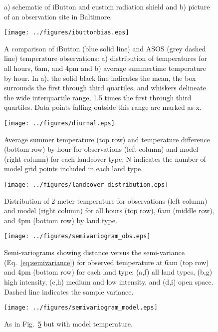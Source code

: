 \documentclass[draft,linenumbers]{agujournal}
\begin{document}
 \begin{figure}[h]
\centering
\caption{a) schematic of iButton and custom radiation shield and b) picture of an observation site in Baltimore.}
\label{fig:ibutton}
 \end{figure}
 
\begin{figure}[h]
\centering
\texttt{[image: ../figures/ibuttonbias.eps]}
\caption{A comparison of iButton (blue solid line) and ASOS (grey dashed line) temperature observations: a) distribution of temperatures for all hours,  6am, and 4pm and b) average summertime temperature by hour. In a), the solid black line indicates the mean, the box surrounds the first through third quartiles, and whiskers delineate the wide interquartile range, 1.5 times the first through third quartiles. Data points falling outside this range are marked as x. }
\label{fig:bias}
\end{figure}

\begin{figure}[h]
\centering
\texttt{[image: ../figures/diurnal.eps]}
\caption{Average summer temperature (top row) and temperature difference (bottom row) by hour for observations (left column) and model (right column) for each landcover type. N indicates the number of model grid points included in each land type. }
\label{fig:diurnal}
\end{figure}

\begin{figure}[h]
\centering
\texttt{[image: ../figures/landcover\_distribution.eps]}
\caption{Distribution of 2-meter temperature for observations (left column) and model (right column) for all hours (top row), 6am (middle row), and 4pm (bottom row) by land type. }
\label{fig:hist}
\end{figure}

\begin{figure}[h]
\centering
\texttt{[image: ../figures/semivariogram\_obs.eps]}
\caption{Semi-variograms showing distance versus the semi-variance (Eq.~\ref{eq:semivariance}) for observed temperature at 6am (top row) and 4pm (bottom row) for each land type: (a,f) all land types, (b,g) high intensity, (c,h) medium and low intensity, and (d,i) open space. Dashed line indicates the sample variance. 
}\label{fig:semiv_obs}

\end{figure}

\begin{figure}[h]
\centering
\texttt{[image: ../figures/semivariogram\_model.eps]}
\caption{As in Fig.~\ref{fig:semiv_obs} but with model temperature.}
\label{fig:semiv_model}
\end{figure}
\end{document}
